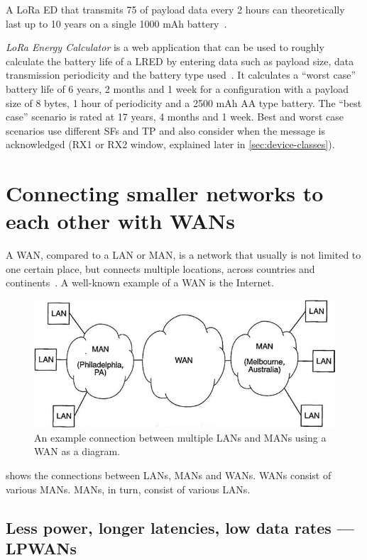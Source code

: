 A \ac{LoRa} \acl{ED} that transmits \SI{75}{\byte} of payload data every 2 hours can theoretically last up to 10 years on a single 1000 mAh battery~\cite{cheong_comparison_2017}.

\emph{LoRa Energy Calculator} is a web application that can be used to roughly calculate the battery life of a \acl{LRED} by entering data such as payload size, data transmission periodicity and the battery type used~\cite{dramco_research_group_lora_2023}.
It calculates a ``worst case'' battery life of 6 years, 2 months and 1 week for a configuration with a payload size of 8 bytes, 1 hour of periodicity and a 2500 mAh AA type battery.
The ``best case'' scenario is rated at 17 years, 4 months and 1 week.
Best and worst case scenarios use different \aclp{SF} and \ac{TP} and also consider when the message is acknowledged (RX1 or RX2 window, explained later in \cref{sec:device-classes}).

\section{Connecting smaller networks to each other with \aclp{WAN}}

A \ac{WAN}, compared to a \acf{LAN} or \acf{MAN}, is a network that usually is not limited to one certain place, but connects multiple locations, across countries and continents~\cite[p. 2]{sadiku_fundamentals_2022}.
A well-known example of a \ac{WAN} is the Internet.

\begin{figure}[htbp]
    \centering
    \includegraphics[width=.6\textwidth]{pictures/lorawan-structure/wan_diagram.png}
    \caption{
        An example connection between multiple \acp{LAN} and \acp{MAN} using a \acf{WAN} as a diagram.\protect\cite{sadiku_fundamentals_2022}
    }\label{pic:wan-diagram}
\end{figure}

 shows the connections between \acp{LAN}, \acp{MAN} and \acp{WAN}.
\acp{WAN} consist of various \acp{MAN}.
\acp{MAN}, in turn, consist of various \acp{LAN}.

\subsection{Less power, longer latencies, low data rates — \aclp{LPWAN}}

